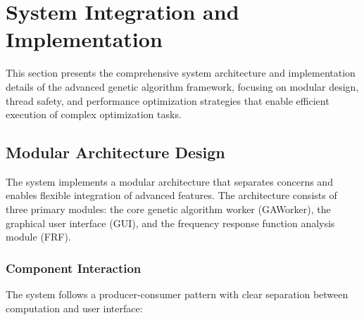 \documentclass[12pt,a4paper]{article}
\begin{document}
\section{System Integration and Implementation}

This section presents the comprehensive system architecture and implementation details of the advanced genetic algorithm framework, focusing on modular design, thread safety, and performance optimization strategies that enable efficient execution of complex optimization tasks.

\subsection{Modular Architecture Design}

The system implements a modular architecture that separates concerns and enables flexible integration of advanced features. The architecture consists of three primary modules: the core genetic algorithm worker (GAWorker), the graphical user interface (GUI), and the frequency response function analysis module (FRF).

\subsubsection{Component Interaction}

The system follows a producer-consumer pattern with clear separation between computation and user interface:
\end{document}
